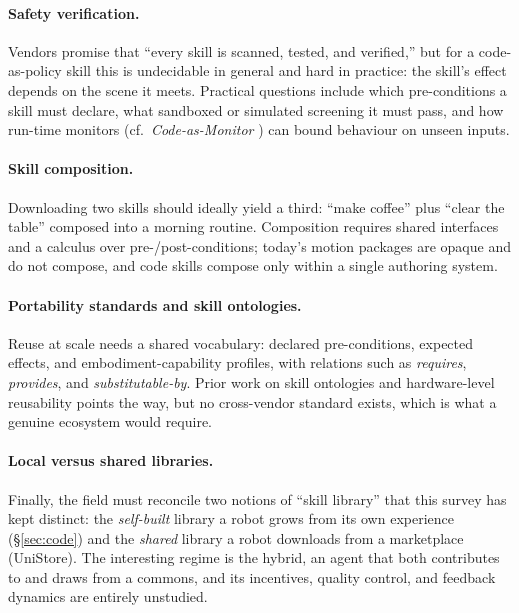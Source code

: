 \paragraph{Safety verification.}
Vendors promise that ``every skill is scanned, tested, and verified,'' but for a
code-as-policy skill this is undecidable in general and hard in practice: the skill's effect
depends on the scene it meets. Practical questions include which pre-conditions a skill must
declare, what sandboxed or simulated screening it must pass, and how run-time monitors
(cf.\ \emph{Code-as-Monitor} \citep{codeasmonitor}) can bound behaviour on unseen inputs.

\paragraph{Skill composition.}
Downloading two skills should ideally yield a third: ``make coffee'' plus ``clear the
table'' composed into a morning routine. Composition requires shared interfaces and a
calculus over pre-/post-conditions; today's motion packages are opaque and do not compose,
and code skills compose only within a single authoring system.

\paragraph{Portability standards and skill ontologies.}
Reuse at scale needs a shared vocabulary: declared pre-conditions, expected effects, and
embodiment-capability profiles, with relations such as \emph{requires}, \emph{provides}, and
\emph{substitutable-by}. Prior work on skill ontologies and hardware-level reusability
points the way, but no cross-vendor standard exists, which is what a genuine ecosystem would
require.

\paragraph{Local versus shared libraries.}
Finally, the field must reconcile two notions of ``skill library'' that this survey has kept
distinct: the \emph{self-built} library a robot grows from its own experience
(\S\ref{sec:code}) and the \emph{shared} library a robot downloads from a marketplace
(UniStore). The interesting regime is the hybrid, an agent that both contributes to and
draws from a commons, and its incentives, quality control, and feedback dynamics are
entirely unstudied.
